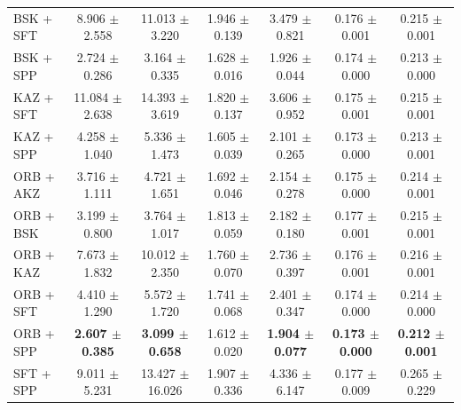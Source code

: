 \begin{table}[hbp]
\begin{tabular}{lcccccc}
BSK + SFT & 8.906 $\pm$ 2.558 & 11.013 $\pm$ 3.220 & 1.946 $\pm$ 0.139 & 3.479 $\pm$ 0.821 & 0.176 $\pm$ 0.001 & 0.215 $\pm$ 0.001 \\
BSK + SPP & 2.724 $\pm$ 0.286 & 3.164 $\pm$ 0.335 & 1.628 $\pm$ 0.016 & 1.926 $\pm$ 0.044 & 0.174 $\pm$ 0.000 & 0.213 $\pm$ 0.000 \\
KAZ + SFT & 11.084 $\pm$ 2.638 & 14.393 $\pm$ 3.619 & 1.820 $\pm$ 0.137 & 3.606 $\pm$ 0.952 & 0.175 $\pm$ 0.001 & 0.215 $\pm$ 0.001 \\
KAZ + SPP & 4.258 $\pm$ 1.040 & 5.336 $\pm$ 1.473 & 1.605 $\pm$ 0.039 & 2.101 $\pm$ 0.265 & 0.173 $\pm$ 0.000 & 0.213 $\pm$ 0.001 \\
ORB + AKZ & 3.716 $\pm$ 1.111 & 4.721 $\pm$ 1.651 & 1.692 $\pm$ 0.046 & 2.154 $\pm$ 0.278 & 0.175 $\pm$ 0.000 & 0.214 $\pm$ 0.001 \\
ORB + BSK & 3.199 $\pm$ 0.800 & 3.764 $\pm$ 1.017 & 1.813 $\pm$ 0.059 & 2.182 $\pm$ 0.180 & 0.177 $\pm$ 0.001 & 0.215 $\pm$ 0.001 \\
ORB + KAZ & 7.673 $\pm$ 1.832 & 10.012 $\pm$ 2.350 & 1.760 $\pm$ 0.070 & 2.736 $\pm$ 0.397 & 0.176 $\pm$ 0.001 & 0.216 $\pm$ 0.001 \\
ORB + SFT & 4.410 $\pm$ 1.290 & 5.572 $\pm$ 1.720 & 1.741 $\pm$ 0.068 & 2.401 $\pm$ 0.347 & 0.174 $\pm$ 0.000 & 0.214 $\pm$ 0.000 \\
ORB + SPP & \textbf{2.607 $\pm$ 0.385} & \textbf{3.099 $\pm$ 0.658} & 1.612 $\pm$ 0.020 & \textbf{1.904 $\pm$ 0.077} & \textbf{0.173 $\pm$ 0.000} & \textbf{0.212 $\pm$ 0.001} \\
SFT + SPP & 9.011 $\pm$ 5.231 & 13.427 $\pm$ 16.026 & 1.907 $\pm$ 0.336 & 4.336 $\pm$ 6.147 & 0.177 $\pm$ 0.009 & 0.265 $\pm$ 0.229 \\
\bottomrule
\end{tabular}
\end{table}